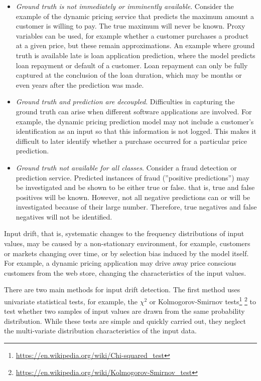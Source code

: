 \begin{itemize}
   \item \emph{Ground truth is not immediately or imminently available}. Consider the example of the dynamic pricing service that predicts the maximum amount a customer is willing to pay. The true maximum will never be known. Proxy variables can be used, for example whether a customer purchases a product at a given price, but these remain approximations. An example where ground truth is available late is loan application prediction, where the model predicts loan repayment or default of a customer. Loan repayment can only be fully captured at the conclusion of the loan duration, which may be months or even years after the prediction was made.
   \item \emph{Ground truth and prediction are decoupled}. Difficulties in capturing the ground truth can arise when different software applications are involved. For example, the dynamic pricing prediction model may not include a customer's identification as an input so that this information is not logged. This makes it difficult to later identify whether a purchase occurred for a particular price prediction.
   \item \emph{Ground truth not available for all classes}. Consider a fraud detection or prediction service. Predicted instances of fraud (''positive predictions'') may be investigated and be shown to be either true or false. that is, true and false positives will be known. However, not all negative predictions can or will be investigated because of their large number. Therefore, true negatives and false negatives will not be identified.
\end{itemize}

Input drift, that is, systematic changes to the frequency distributions of input values, may be caused by a non-stationary environment, for example, customers or markets changing over time, or by selection bias induced by the model itself. For example, a dynamic pricing application may drive away price conscious customers from the web store, changing the characteristics of the input values.

There are two main methods for input drift detection. The first method uses univariate statistical tests, for example, the  $\chi^2$ or Kolmogorov-Smirnov tests\footnote{\url{https://en.wikipedia.org/wiki/Chi-squared_test}} \footnote{\url{https://en.wikipedia.org/wiki/Kolmogorov-Smirnov_test}} to test whether two samples of input values are drawn from the same probability distribution. While these tests are simple and quickly carried out, they neglect the multi-variate distribution characteristics of the input data. 

